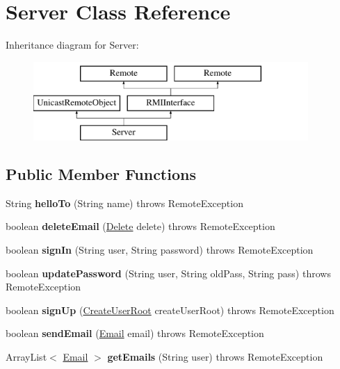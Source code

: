 \hypertarget{class_server}{}\section{Server Class Reference}
\label{class_server}
Inheritance diagram for Server\+:\begin{figure}[H]
\begin{center}
\leavevmode
\includegraphics[height=3.000000cm]{class_server}
\end{center}
\end{figure}
\subsection*{Public Member Functions}
\begin{DoxyCompactItemize}
\item 
\mbox{\label{class_server_a5bb8a4d74a82c7e2590de523648fa3ab}} 
String {\bfseries hello\+To} (String name)  throws Remote\+Exception 
\item 
\mbox{\label{class_server_ad679fc8c7704690482684e42cc15c740}} 
boolean {\bfseries delete\+Email} (\hyperlink{class_delete}{Delete} delete)  throws Remote\+Exception
\item 
\mbox{\label{class_server_a817e1af39aeac07664ce011c44013e55}} 
boolean {\bfseries sign\+In} (String user, String password)  throws Remote\+Exception 
\item 
\mbox{\label{class_server_a729c6728075152e3550160273869e992}} 
boolean {\bfseries update\+Password} (String user, String old\+Pass, String pass)  throws Remote\+Exception 
\item 
\mbox{\label{class_server_a9e4fcd4cc8bfb0484735adfcf38be657}} 
boolean {\bfseries sign\+Up} (\hyperlink{class_create_user_root}{Create\+User\+Root} create\+User\+Root)  throws Remote\+Exception 
\item 
\mbox{\label{class_server_a4c26769f2867086519a196bc92502af6}} 
boolean {\bfseries send\+Email} (\hyperlink{class_email}{Email} email)  throws Remote\+Exception 
\item 
\mbox{\label{class_server_a348f49650335ef5341a4d960d6adac2e}} 
Array\+List$<$ \hyperlink{class_email}{Email} $>$ {\bfseries get\+Emails} (String user)  throws Remote\+Exception 
\end{DoxyCompactItemize}
